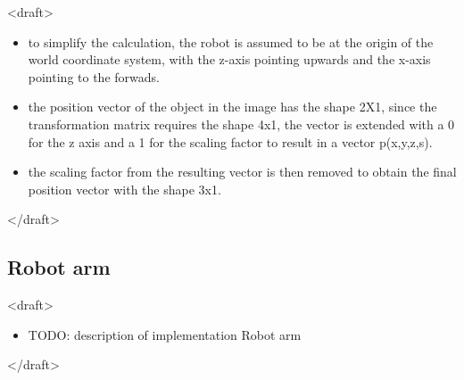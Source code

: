 
      
      
    
    



<draft>
\begin{itemize}
    \item to simplify the calculation, the robot is assumed to be at the origin of the world coordinate system, with the z-axis pointing upwards and the x-axis pointing to the forwads.  
    \item the position vector of the object in the image has the shape 2X1, since the transformation matrix requires the shape 4x1, the vector is extended with a 0 for the z axis and a 1 for the scaling factor to result in a vector p(x,y,z,s).  
    \item the scaling factor from the resulting vector is then removed to obtain the final position vector with the shape 3x1.  
\end{itemize}
  
</draft>

\subsection{Robot arm}

<draft>
\begin{itemize}
    \item TODO: description of implementation Robot arm
\end{itemize}
</draft>

